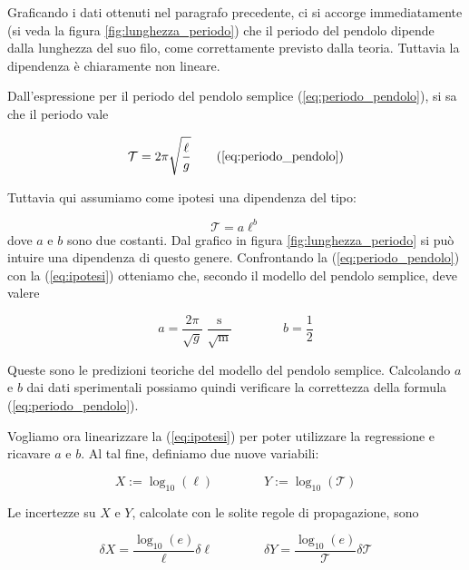 Graficando i dati ottenuti nel paragrafo precedente, ci si accorge immediatamente (si veda
la figura \ref{fig:lunghezza_periodo}) che il periodo del pendolo dipende dalla lunghezza
del suo filo, come correttamente previsto dalla teoria. Tuttavia la dipendenza è chiaramente non lineare.

Dall'espressione per il periodo del pendolo semplice (\ref{eq:periodo_pendolo}), si sa che
il periodo vale

\begin{equation}
    \mathcal{T} = 2\pi\sqrt{\frac{\ell}{g}}
    \tag{\ref{eq:periodo_pendolo}}
\end{equation}

Tuttavia qui assumiamo come ipotesi una dipendenza del tipo:

\begin{equation}
    \mathcal{T} = a\ell^b
    \label{eq:ipotesi}
\end{equation}
%
dove $a$ e $b$ sono due costanti. Dal grafico in figura \ref{fig:lunghezza_periodo} si può intuire una dipendenza di questo genere.
Confrontando la (\ref{eq:periodo_pendolo}) con la (\ref{eq:ipotesi}) otteniamo che, secondo il modello
del pendolo semplice, deve valere

\begin{equation}
    a = \frac{2\pi}{\sqrt{g}} \; \frac{\text{s}}{\sqrt{\text{m}}} \qquad \qquad b = \frac{1}{2}
\end{equation}

Queste sono le predizioni teoriche del modello del pendolo semplice. Calcolando $a$ e $b$ dai dati sperimentali
possiamo quindi verificare la correttezza della formula (\ref{eq:periodo_pendolo}).

Vogliamo ora linearizzare la (\ref{eq:ipotesi}) per poter utilizzare la regressione e ricavare $a$ e $b$.
Al tal fine, definiamo due nuove variabili:

\begin{equation}
    X := \log_{10}{(\ell)} \qquad \qquad Y := \log_{10}{(\mathcal{T})}
    \label{eq:vars}
\end{equation}

Le incertezze su $X$ e $Y$, calcolate con le solite regole di propagazione, sono

\begin{equation}
    \delta X = \frac{\log_{10}(e)}{\ell}\delta \ell
    \qquad \qquad
    \delta Y = \frac{\log_{10}(e)}{\mathcal{T}}\delta\mathcal{T}
    \label{eq:delta_XY}
\end{equation}

